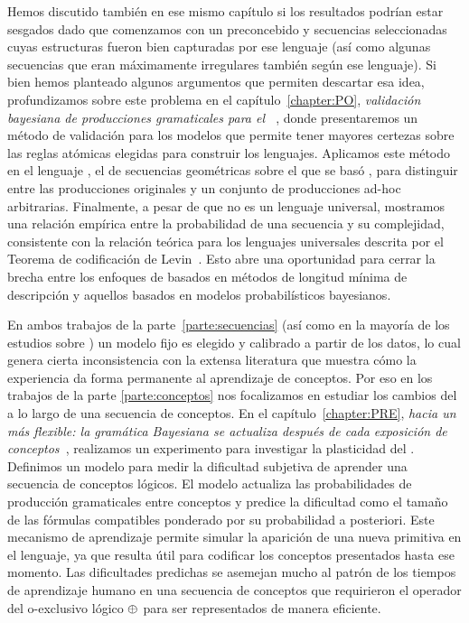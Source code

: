 Hemos discutido también en ese mismo capítulo si los resultados podrían estar sesgados dado que comenzamos con un \lot preconcebido y secuencias seleccionadas cuyas estructuras fueron bien capturadas por ese lenguaje (así como algunas secuencias que eran máximamente irregulares también según ese lenguaje). Si bien hemos planteado algunos argumentos que permiten descartar esa idea, profundizamos sobre este problema en el capítulo~\ref{chapter:PO}, \textit{validación bayesiana de producciones gramaticales para el \lot~\cite{romano2018bayesian}}, donde presentaremos un método de validación para los modelos \lot que permite tener mayores certezas sobre las reglas atómicas elegidas para construir los lenguajes. Aplicamos este método en el lenguaje \gramgeo, el \lot de secuencias geométricas sobre el que se basó \grambin, para distinguir entre las producciones originales y un conjunto de producciones ad-hoc arbitrarias. Finalmente, a pesar de que \gramgeo no es un lenguaje universal, mostramos una relación empírica entre la probabilidad de una secuencia y su complejidad, consistente con la relación teórica para los lenguajes universales descrita por el Teorema de codificación de Levin~\cite{levin1974laws}. Esto abre una oportunidad para cerrar la brecha entre los enfoques de \lot basados en métodos de longitud mínima de descripción y aquellos basados en modelos probabilísticos bayesianos.

En ambos trabajos de la parte~\ref{parte:secuencias} (así como en la mayoría de los estudios sobre \lot) un modelo fijo es elegido y calibrado a partir de los datos, lo cual genera cierta inconsistencia con la extensa literatura que muestra cómo la experiencia da forma permanente al aprendizaje de conceptos. Por eso en los trabajos de la parte \ref{parte:conceptos} nos focalizamos en estudiar los cambios del \lot a lo largo de una secuencia de conceptos. En el capítulo~\ref{chapter:PRE}, \textit{hacia un \lot más flexible: la gramática Bayesiana se actualiza después de cada exposición de conceptos~\cite{tano2020towards}}, realizamos un experimento para investigar la plasticidad del \lot. Definimos un modelo para medir la dificultad subjetiva de aprender una secuencia de conceptos lógicos. El modelo actualiza las probabilidades de producción gramaticales entre conceptos y predice la dificultad como el tamaño de las fórmulas compatibles ponderado por su probabilidad a posteriori. Este mecanismo de aprendizaje permite simular la aparición de una nueva primitiva en el lenguaje, ya que resulta útil para codificar los conceptos presentados hasta ese momento. Las dificultades predichas se asemejan mucho al patrón de los tiempos de aprendizaje humano en una secuencia de conceptos que requirieron el operador del o-exclusivo lógico $ \oplus $ para ser representados de manera eficiente.

